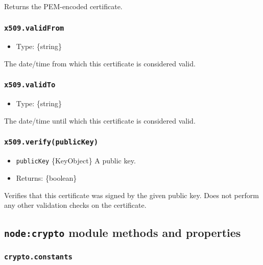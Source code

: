 Returns the PEM-encoded certificate.

\subsubsection{\texorpdfstring{\texttt{x509.validFrom}}{x509.validFrom}}\label{x509.validfrom}

\begin{itemize}
\tightlist
\item
  Type: \{string\}
\end{itemize}

The date/time from which this certificate is considered valid.

\subsubsection{\texorpdfstring{\texttt{x509.validTo}}{x509.validTo}}\label{x509.validto}

\begin{itemize}
\tightlist
\item
  Type: \{string\}
\end{itemize}

The date/time until which this certificate is considered valid.

\subsubsection{\texorpdfstring{\texttt{x509.verify(publicKey)}}{x509.verify(publicKey)}}\label{x509.verifypublickey}

\begin{itemize}
\tightlist
\item
  \texttt{publicKey} \{KeyObject\} A public key.
\item
  Returns: \{boolean\}
\end{itemize}

Verifies that this certificate was signed by the given public key. Does
not perform any other validation checks on the certificate.

\subsection{\texorpdfstring{\texttt{node:crypto} module methods and
properties}{node:crypto module methods and properties}}\label{nodecrypto-module-methods-and-properties}

\subsubsection{\texorpdfstring{\texttt{crypto.constants}}{crypto.constants}}\label{crypto.constants}

